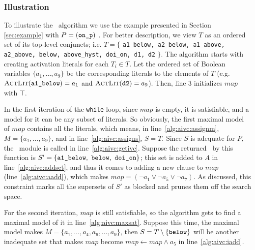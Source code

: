 \subsubsection{Illustration}
\label{sec:illust}
To illustrate the \aivcalg ~algorithm we use the example presented in Section \ref{sec:example} with $P = ({\small \texttt{on\_p}})$ .
For better description, we view $T$ as an ordered set of its top-level conjuncts; i.e. $T = \{$ {\small \texttt{a1\_below, a2\_below, a1\_above, a2\_above, below, above\_hyst, doi\_on, d1, d2}} $\}$.
The algorithm starts with creating activation literals for each $T_i \in T$. Let the ordered set of Boolean variables $\{ a_1, \ldots , a_9 \}$ be the corresponding literals to the elements of $T$ (e.g. $\actlit ({ \small \texttt{a1\_below}}) = a_1$ and $\actlit ({\small \texttt{d2}}) = a_9$). Then, line 3 initializes $map$ with $\top$.

In the first iteration of the \texttt{while} loop, since $map$ is
empty, it is satisfiable, and a model for it can be any subset of
literals. So obviously, the first maximal model of $map$ contains all
the literals, which means, in line~\ref{alg:aivc:assignm}, $M = \{a_1,
\ldots, a_9\}$, and in line~\ref{alg:aivc:assigns}, $S = T$. Since $S$
is adequate for $P$, the \getivc ~module is called in
line~\ref{alg:aivc:getivc}. Suppose the returned \mivc\ by this function
is $S' = \{ { \small \texttt{a1\_below},~\texttt{below},
  ~\texttt{doi\_on}}\}$; this set is added to $A$ in
line~\ref{alg:aivc:addset}, and thus it comes to adding a new clause
to $map$ (line~\ref{alg:aivc:aadd}), which makes $map = (\neg a_1 \vee
\neg a_5 \vee \neg a_7)$. As discussed, this constraint
marks all the supersets of $S'$ as blocked and prunes them off the
search space.

For the second iteration, $map$ is still satisfiable,
so the algorithm gets to find a maximal model of it in line~\ref{alg:aivc:maxsat}. Suppose this time, the maximal model makes $M = \{a_1, \ldots, a_4, a_6, \ldots, a_9\}$, then $S = T \setminus \{ {\small \texttt{below}}\} $ will be another inadequate set that makes $map$ become
$map \leftarrow map \wedge a_5$
in line~\ref{alg:aivc:iadd}.

